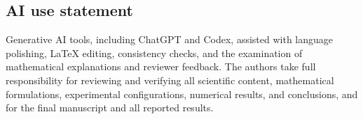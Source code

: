 \documentclass{article}
\begin{document}
\subsection*{AI use statement}
Generative AI tools, including ChatGPT and Codex, assisted with language polishing, LaTeX editing, consistency checks, and the examination of mathematical explanations and reviewer feedback. The authors take full responsibility for reviewing and verifying all scientific
content, mathematical formulations, experimental configurations, numerical
results, and conclusions, and for the final manuscript and all reported results.




\appendix





\FloatBarrier

\FloatBarrier

\FloatBarrier

\clearpage

\clearpage

\end{document}
